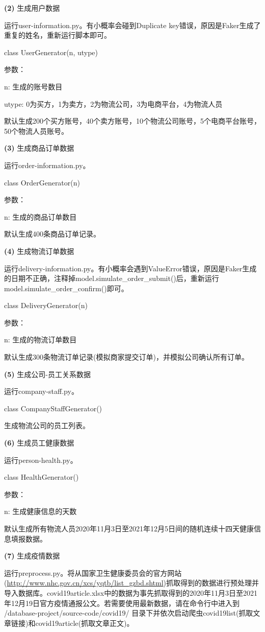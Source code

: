 \documentclass[12pt]{article}
\begin{document}
\noindent \textbf{(2)} 生成用户数据 \par 
运行user-information.py。有小概率会碰到Duplicate key错误，原因是Faker生成了重复的姓名，重新运行脚本即可。\par 
class UserGenerator(n, utype) \par 
\noindent 参数：\par 
n: 生成的账号数目 \par 
utype: 0为买方，1为卖方，2为物流公司，3为电商平台，4为物流人员 \par 
\noindent 默认生成200个买方账号，40个卖方账号，10个物流公司账号，5个电商平台账号，50个物流人员账号。

\noindent \textbf{(3)} 生成商品订单数据 \par 
运行order-information.py。\par 
class OrderGenerator(n) \par 
\noindent 参数：\par 
n: 生成的商品订单数目 \par 
\noindent 默认生成400条商品订单记录。

\noindent \textbf{(4)} 生成物流订单数据 \par 
运行delivery-information.py。有小概率会遇到ValueError错误，原因是Faker生成的日期不正确，注释掉model.simulate\_order\_submit()后，重新运行model.simulate\_order\_confirm()即可。\par 
class DeliveryGenerator(n) \par 
\noindent 参数：\par 
n: 生成的物流订单数目 \par 
\noindent 默认生成300条物流订单记录(模拟商家提交订单)，并模拟公司确认所有订单。

\noindent \textbf{(5)} 生成公司-员工关系数据 \par
运行company-staff.py。\par 
class CompanyStaffGenerator() \par 
\noindent 生成物流公司的员工列表。

\noindent \textbf{(6)} 生成员工健康数据 \par 
运行person-health.py。\par 
class HealthGenerator() \par 
\noindent 参数：\par 
n: 生成健康信息的天数 \par
\noindent 默认生成所有物流人员2020年11月3日至2021年12月5日间的随机连续十四天健康信息填报数据。

\noindent \textbf{(7)} 生成疫情数据 \par 
运行preprocess.py。将从国家卫生健康委员会的官方网站(\url{http://www.nhc.gov.cn/xcs/yqtb/list_gzbd.shtml})抓取得到的数据进行预处理并导入数据库。covid19article.xlsx中的数据为事先抓取得到的2020年11月3日至2021年12月19日官方疫情通报公文。若需要使用最新数据，请在命令行中进入到 /database-project/source-code/covid19/ 目录下并依次启动爬虫covid19list(抓取文章链接)和covid19article(抓取文章正文)。
\end{document}

